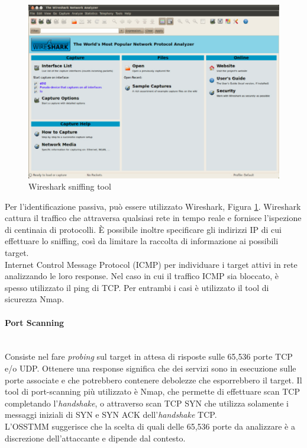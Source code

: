 \begin{figure}[hbtp]
	\centering
	\includegraphics[scale=.3]{imgs/attack/wireshark.png}
	\caption{Wireshark sniffing tool}
	\label{wireshark_img}
\end{figure}

Per l'identificazione passiva, può essere utilizzato Wireshark, Figura \ref{wireshark_img}.\cite{wireshark} Wireshark cattura il traffico che attraversa qualsiasi rete in tempo reale e fornisce l'ispezione di centinaia di protocolli. È possibile inoltre specificare gli indirizzi IP di cui effettuare lo sniffing, così da limitare la raccolta di informazione ai possibili target.\\
Internet Control Message Protocol (ICMP) per individuare i target attivi in rete analizzando le loro response. Nel caso in cui il traffico ICMP sia bloccato, è spesso utilizzato il ping di TCP. Per entrambi i casi è utilizzato il tool di sicurezza Nmap.\cite{nmap}

\paragraph{Port Scanning}\mbox{}\\
Consiste nel fare \emph{probing} sul target in attesa di risposte sulle 65,536 porte TCP e/o UDP. Ottenere una response significa che dei servizi sono in esecuzione sulle porte associate e che potrebbero contenere debolezze che esporrebbero il target. Il tool di port-scanning più utilizzato è Nmap, che permette di effettuare scan TCP completando l'\emph{handshake}, o attraverso scan TCP SYN che utilizza solamente i messaggi iniziali di SYN e SYN ACK dell'\emph{handshake} TCP.\\
L'OSSTMM suggerisce che la scelta di quali delle 65,536 porte da analizzare è a discrezione dell'attaccante e dipende dal contesto.

